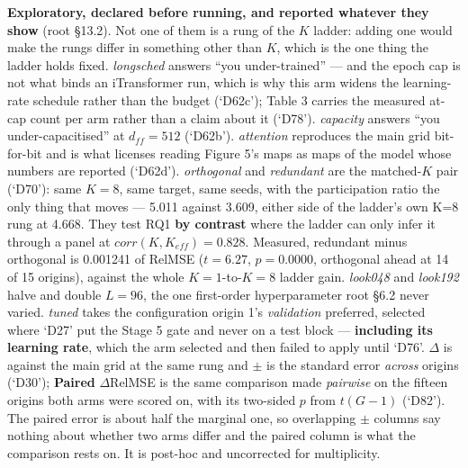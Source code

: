 \begin{table}[!t]
\vspace{2pt}\par\footnotesize \textbf{Exploratory, declared before running, and reported whatever they show} (root §13.2). Not one of them is a rung of the $K$ ladder: adding one would make the rungs differ in something other than $K$, which is the one thing the ladder holds fixed. \emph{longsched} answers ``you under-trained'' --- and the epoch cap is not what binds an iTransformer run, which is why this arm widens the learning-rate schedule rather than the budget (`D62c'); Table 3 carries the measured at-cap count per arm rather than a claim about it (`D78'). \emph{capacity} answers ``you under-capacitised'' at $d_{ff} = 512$ (`D62b'). \emph{attention} reproduces the main grid bit-for-bit and is what licenses reading Figure 5's maps as maps of the model whose numbers are reported (`D62d'). \emph{orthogonal} and \emph{redundant} are the matched-$K$ pair (`D70'): same $K = 8$, same target, same seeds, with the participation ratio the only thing that moves --- 5.011 against 3.609, either side of the ladder's own K=8 rung at 4.668. They test RQ1 \textbf{by contrast} where the ladder can only infer it through a panel at $corr(K, K_{eff}) = 0.828$. Measured, redundant minus orthogonal is 0.001241 of RelMSE ($t = 6.27$, $p = 0.0000$, orthogonal ahead at 14 of 15 origins), against the whole $K=1$-to-$K=8$ ladder gain. \emph{look048} and \emph{look192} halve and double $L = 96$, the one first-order hyperparameter root §6.2 never varied. \emph{tuned} takes the configuration origin 1's \emph{validation} preferred, selected where `D27' put the Stage 5 gate and never on a test block --- \textbf{including its learning rate}, which the arm selected and then failed to apply until `D76'. $\Delta$ is against the main grid at the same rung and $\pm$ is the standard error \emph{across} origins (`D30'); \textbf{Paired} $\Delta$RelMSE is the same comparison made \emph{pairwise} on the fifteen origins both arms were scored on, with its two-sided $p$ from $t(G-1)$ (`D82'). The paired error is about half the marginal one, so overlapping $\pm$ columns say nothing about whether two arms differ and the paired column is what the comparison rests on. It is post-hoc and uncorrected for multiplicity.
\end{table}
